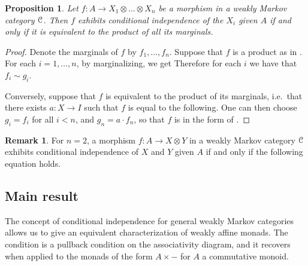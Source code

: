 \documentclass[a4paper,UKenglish,numberwithinsect,cleveref, autoref, thm-restate]{lipics-v2021}
\theoremstyle{plain} %
\newtheorem{myproposition}[mytheorem]{Proposition}
\theoremstyle{definition} %
\newtheorem{myremark}[mytheorem]{Remark}
\begin{document}
\begin{myproposition}\label{eqcondind}
 Let $f:A\to X_1\otimes\dots\otimes X_n$ be a morphism in a weakly Markov category $\mathcal{C}$. Then $f$ exhibits conditional independence of the $X_i$ given $A$ if and only if it is equivalent to the product of all its marginals.
\end{myproposition}

\begin{proof}
 Denote the marginals of $f$ by $f_1,\dots,f_n$.
 Suppose that $f$ is a product as in . For each $i=1,\dots,n$, by marginalizing, we get
 Therefore for each $i$ we have that $f_i\sim g_i$. 
 
 Conversely, suppose that $f$ is equivalent to the product of its marginals, i.e.~that there exists $a:X\to I$ such that $f$ is equal to the following.
 One can then choose $g_i=f_i$ for all $i<n$, and $g_n = a\cdot f_n$, so that $f$ is in the form of .
\end{proof} 
 
\begin{myremark}
 For $n=2$, a morphism $f:A\to X\otimes Y$ in a weakly Markov category $\mathcal{C}$ exhibits conditional independence of $X$ and $Y$ given $A$ 
 if and only if the following equation holds.
\end{myremark}


\subsection{Main result}

The concept of conditional independence for general weakly Markov categories allows us to give an equivalent characterization of weakly affine monads.
The condition is a pullback condition on the associativity diagram, and it recovers  when applied to the monads of the form $A \times -$ for $A$ a commutative monoid.
\end{document}
